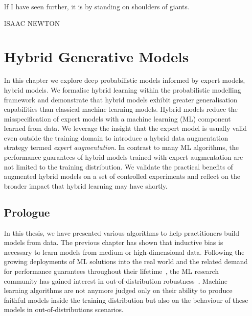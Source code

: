 \null\vfill
{\centering
\parbox{\textwidth}{%
  \raggedright
  {%

   If I have seen further, it is by standing on shoulders of giants.\par\bigskip
  }
  \raggedleft\MakeUppercase{Isaac Newton}\par%
}}

\vfill\vfill

\chapter{Hybrid Generative Models}\label{ch:07}

\begin{chapter_outline}

In this chapter we explore deep probabilistic models informed by expert models, hybrid models.
We formalise hybrid learning within the probabilistic modelling framework and demonstrate that hybrid models exhibit greater generalisation capabilities than classical machine learning models.
Hybrid models reduce the misspecification of expert models with a machine learning (ML) component learned from data. We leverage the insight that the expert model is usually valid even outside the training domain to introduce a hybrid data augmentation strategy termed \textit{expert augmentation}. In contrast to many ML algorithms, the performance guarantees of hybrid models trained with expert augmentation are not limited to the training distribution. We validate the practical benefits of augmented hybrid models on a set of controlled experiments and reflect on the broader impact that hybrid learning may have shortly.

\end{chapter_outline}

\section{Prologue}
In this thesis, we have presented various algorithms to help practitioners build models from data. The previous chapter has shown that inductive bias is necessary to learn models from medium or high-dimensional data. Following the growing deployments of ML solutions into the real world and the related demand for performance guarantees throughout their lifetime~\citep{lwakatare2020large}, the ML research community has gained interest in out-of-distribution robustness~\citep{sehwag2019analyzing, hendrycks2021many}. Machine learning algorithms are not anymore judged only on their ability to produce faithful models inside the training distribution but also on the behaviour of these models in out-of-distributions scenarios.

